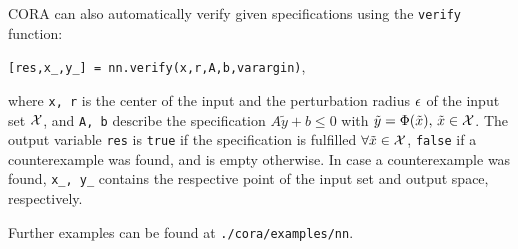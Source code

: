 \begin{center}
    \begin{minipage}[t]{0.9\textwidth}
    {\footnotesize  }
    \end{minipage}
\end{center}

CORA can also automatically verify given specifications using the \texttt{verify} function:

\begin{center}
    \texttt{[res,x\_,y\_] = nn.verify(x,r,A,b,varargin)},
\end{center}

where \texttt{x, r} is the center of the input and the perturbation radius $\epsilon$ of the input set $\mathcal{X}$,
and \texttt{A, b} describe the specification $A\tilde{y}+b\leq0$ with $\tilde{y}=\Phi(\tilde{x}),\,\tilde{x}\in\mathcal{X}$.
The output variable \texttt{res} is \texttt{true} if the specification is fulfilled $\forall \tilde{x}\in\mathcal{X}$,
\texttt{false} if a counterexample was found, and is empty otherwise.
In case a counterexample was found, \texttt{x\_, y\_} contains the respective point of the input set and output space, respectively.

Further examples can be found at \texttt{./cora/examples/nn}.
